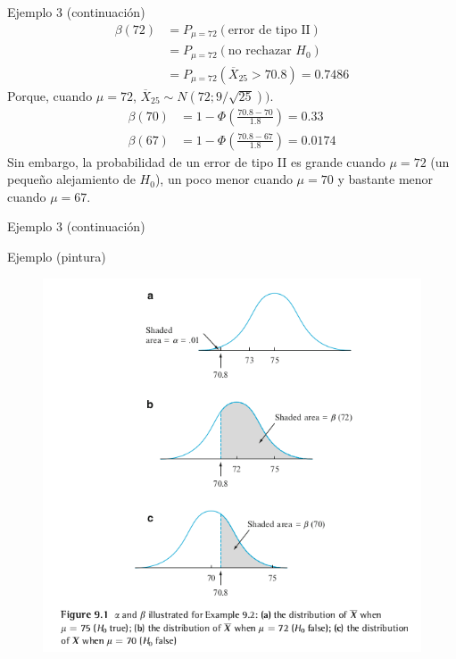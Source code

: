 \documentclass{beamer}
\theoremstyle{definition}
\begin{document}
 \begin{frame}{\color{rosee}Ejemplo 3 (continuación)}
    \begin{align*}
      \beta(72)
      &= P_{\mu=72}(\mbox{error de tipo II}) \\
      &= P_{\mu=72}(\mbox{no rechazar }H_0) \\
      &= P_{\mu=72}(\overline{X}_{25}> 70.8) = 0.7486
    \end{align*}
Porque, cuando $\mu=72$, $\overline{X}_{25}\sim N(72;9/\sqrt{25}))$.
    \begin{align*}
      \beta(70) &= 1- \Phi\left(\frac{70.8-70}{1.8}\right) = 0.33\\
      \beta(67) &= 1- \Phi\left(\frac{70.8-67}{1.8}\right) = 0.0174
    \end{align*}
    Sin embargo, la probabilidad de un error de tipo II es grande cuando
    $\mu = 72$ (un peque\~no alejamiento de $H_0$), un poco menor cuando
    $\mu = 70$ y bastante menor cuando $\mu = 67$. %

 
\end{frame}


 \begin{frame}{\color{rosee}Ejemplo 3 (continuación)}\small
  \begin{exampleblock}{Ejemplo (pintura)}
    \begin{figure}
      \centering
      \includegraphics[height=.8\textheight]{img/pintura-devore.png}
    \end{figure}
  \end{exampleblock}
\end{frame}
\end{document}
